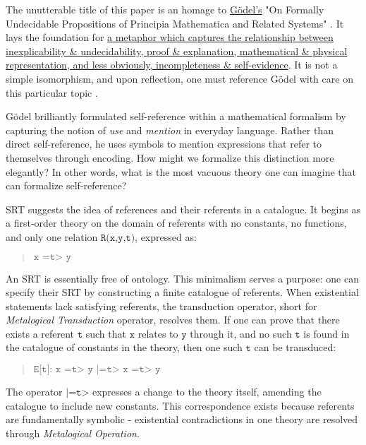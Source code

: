 \documentclass[runningheads]{llncs}
\newcommand{\lib}[2]{\href{https://dna-platform.github.io/inexplicable-phenomena#1}{#2}\xspace}
\begin{document}
The unutterable title of this paper is an homage to \lib{/a-novel-perspective/a-novel-perspective.html}{Gödel's} "On Formally Undecidable Propositions of Principia Mathematica and Related Systems" \cite{Godel1962} \cite{Godel1931}. It lays the foundation for \href{https://dna-platform.github.io/inexplicable-phenomena//a-novel-perspective/a-novel-perspective.html}{a metaphor which captures the relationship between inexplicability \& undecidability, proof \& explanation, mathematical \& physical representation, and less obviously, incompleteness \& self-evidence}\xspace. It is not a simple isomorphism, and upon reflection, one must reference Gödel with care on this particular topic\cite{Feferman1995} \cite{Feferman1991}.

Gödel brilliantly formulated self-reference within a mathematical formalism by capturing the notion of \emph{use} and \emph{mention} in everyday language\cite{Quine1940}. Rather than direct self-reference, he uses symbols to mention expressions that refer to themselves through encoding. How might we formalize this distinction more elegantly? In other words, what is the most vacuous theory one can imagine that can formalize self-reference?

SRT suggests the idea of references and their referents in a catalogue. It begins as a first-order theory on the domain of referents with no constants, no functions, and only one relation $\texttt{R(x,y,t)}$, expressed as:

\begin{quote}
$\texttt{x =t> y}$
\end{quote}

An SRT is essentially free of ontology. This minimalism serves a purpose: one can specify their SRT by constructing a finite catalogue of referents. When existential statements lack satisfying referents, the transduction operator, short for \emph{Metalogical Transduction} operator, resolves them. If one can prove that there exists a referent $\texttt{t}$ such that $\texttt{x}$ relates to $\texttt{y}$ through it, and no such $\texttt{t}$ is found in the catalogue of constants in the theory, then one such $\texttt{t}$ can be transduced:

\begin{quote}
$\texttt{E[t]: x =t> y |=t> x =t> y}$
\end{quote}

The operator $\texttt{|=t>}$ expresses a change to the theory itself, amending the catalogue to include new constants. This correspondence exists because referents are fundamentally symbolic - existential contradictions in one theory are resolved through \emph{Metalogical Operation}.
\end{document}
